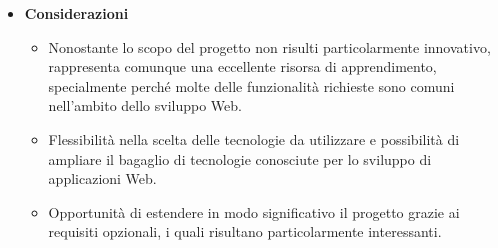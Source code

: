 \documentclass{article}
\begin{document}
\begin{itemize}
    \item[] \textbf{Considerazioni}
    \begin{itemize}
        \item Nonostante lo scopo del progetto non risulti particolarmente innovativo, rappresenta comunque una eccellente risorsa di apprendimento, specialmente perché molte delle funzionalità richieste sono comuni nell’ambito dello sviluppo Web.
        \item Flessibilità nella scelta delle tecnologie da utilizzare e possibilità di ampliare il bagaglio di tecnologie conosciute per lo sviluppo di applicazioni Web.
        \item Opportunità di estendere in modo significativo il progetto grazie ai requisiti opzionali, i quali risultano particolarmente interessanti.
    \end{itemize} 
    
\end{itemize}
\pagebreak

\end{document}
